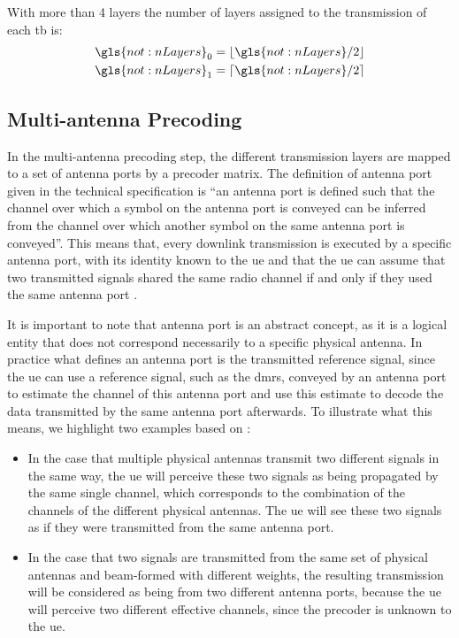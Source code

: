 %
With more than 4 layers the number of layers assigned to the transmission of each \gls{tb} is:
\begin{equation}
    \begin{gathered}
        \gls{not:nLayers}_0 = \floor{\gls{not:nLayers}/2} \\
        \gls{not:nLayers}_1 = \ceil{\gls{not:nLayers}/2}
    \end{gathered}
\end{equation}


\subsection{Multi-antenna Precoding}

In the multi-antenna precoding step, the different transmission layers are mapped to a set of antenna ports by a precoder matrix.
%
The definition of antenna port given in the technical specification \cite{3gpp.38.211} is ``an antenna port is defined such that the channel over which a symbol on the antenna port is conveyed can be inferred from the channel over which another symbol on the same antenna port is conveyed''\cite[Section 4.4.1]{3gpp.38.211}.
%
This means that, every downlink transmission is executed by a specific antenna port, with its identity known to the \gls{ue} and that the \gls{ue} can assume that two transmitted signals shared the same radio channel if and only if they used the same antenna port \cite{ErikDahlman5G, AliZaidi632018}.
%

It is important to note that antenna port is an abstract concept, as it is a logical entity that does not correspond necessarily to a specific physical antenna.
%
In practice what defines an antenna port is the transmitted reference signal, since the \gls{ue} can use a reference signal, such as the \gls{dmrs}, conveyed by an antenna port to estimate the channel of this antenna port and use this estimate to decode the data transmitted by the same antenna port afterwards.
%
To illustrate what this means, we highlight two examples based on \cite{ErikDahlman5G, AliZaidi632018}:
\begin{itemize}
    \item In the case that multiple physical antennas transmit two different signals in the same way, the \gls{ue} will perceive these two signals as being propagated by the same single channel, which corresponds to the combination of the channels of the different physical antennas. The \gls{ue} will see these two signals as if they were transmitted from the same antenna port.

    \item In the case that two signals are transmitted from the same set of physical antennas and beam-formed with different weights, the resulting transmission will be considered as being from two different antenna ports, because the \gls{ue} will perceive two different effective channels, since the precoder is unknown to the \gls{ue}.
\end{itemize}


